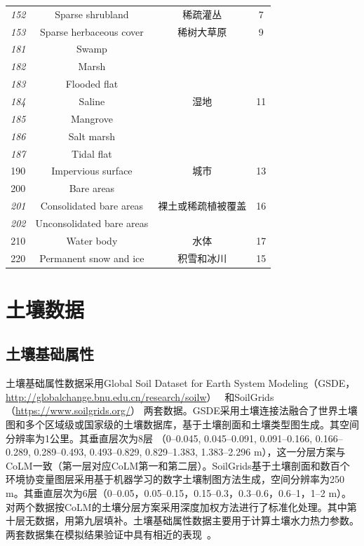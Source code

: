 \begin{table}[htbp]
\begin{tabular}{cccc}
%
\cline{1-4} \textit{152} & Sparse shrubland & 稀疏灌丛 & 7 \\
%
\cline{1-4} \textit{153} & Sparse herbaceous cover & 稀树大草原 & 9 \\
%
\cline{1-4} \textit{181} & Swamp & \multirow{7}{*}{湿地} & \multirow{7}{*}{11} \\
 \textit{182} & Marsh & & \\
 \textit{183} & Flooded flat & & \\
 \textit{184} & Saline & & \\
 \textit{185} & Mangrove & & \\
 \textit{186} & Salt marsh & & \\
 \textit{187} & Tidal flat & & \\
%
\cline{1-4} 190 & Impervious surface & 城市 & 13 \\
%
\cline{1-4} 200 & Bare areas & \multirow{3}{*}{裸土或稀疏植被覆盖} & \multirow{3}{*}{16} \\
 \textit{201} & Consolidated bare areas & & \\
 \textit{202} & Unconsolidated bare areas & & \\
%
\cline{1-4} 210 & Water body & 水体 & 17 \\
%
\cline{1-4} 220 & Permanent snow and ice & 积雪和冰川 & 15 \\
%
\bottomrule
\end{tabular}
\end{table}

\section{土壤数据}\label{土壤数据}
\subsection{土壤基础属性}\label{土壤基础属性}
土壤基础属性数据采用Global Soil Dataset for Earth System Modeling（GSDE，\url{http://globalchange.bnu.edu.cn/research/soilw}）~\citep{shangguan2014global}
和SoilGrids（\url{https://www.soilgrids.org/}）\citep{poggio2021soilgrids} 两套数据。GSDE采用土壤连接法融合了世界土壤图和多个区域级或国家级的土壤数据库，基于土壤剖面和土壤类型图生成。其空间分辨率为1公里。其垂直层次为8层 （0--0.045, 0.045--0.091, 0.091--0.166, 0.166--0.289, 0.289--0.493, 0.493--0.829, 0.829--1.383, 1.383--2.296 m），这一分层方案与CoLM一致（第一层对应CoLM第一和第二层）。SoilGrids基于土壤剖面和数百个环境协变量图层采用基于机器学习的数字土壤制图方法生成，空间分辨率为250 m。其垂直层次为6层（0--0.05，0.05--0.15，0.15--0.3，0.3--0.6，0.6--1，1--2 m）。对两个数据按CoLM的土壤分层方案采用深度加权方法进行了标准化处理。其中第十层无数据，用第九层填补。土壤基础属性数据主要用于计算土壤水力热力参数。两套数据集在模拟结果验证中具有相近的表现~\citep{李文耀2020土壤}。

